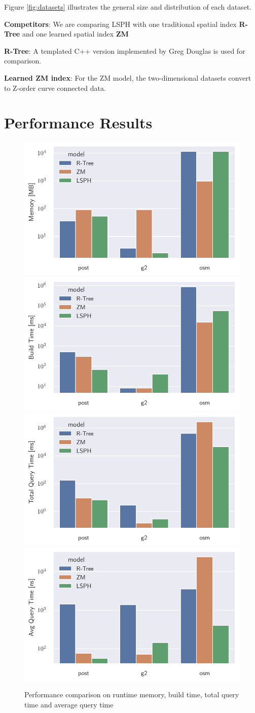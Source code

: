 Figure \ref{fig:datasets} illustrates the general size and distribution of each dataset. 

\textbf{Competitors}:
We are comparing LSPH with one traditional spatial index \textbf{R-Tree} \cite{Guttman:1984ka} and one learned spatial index \textbf{ZM} \cite{Wang:2019ks}

\textbf{R-Tree}: A templated C++ version implemented by Greg Douglas \cite{rtreecplus} is used for comparison. 

\textbf{Learned ZM index}:  For the ZM model, the two-dimensional datasets convert to Z-order curve connected data. 



\section{Performance Results}

\begin{figure}
    \includegraphics[width=.5\textwidth]{Figures/memory.pdf}\hfill
    \includegraphics[width=.5\textwidth]{Figures/build_time.pdf}
    \\[\smallskipamount]
    \includegraphics[width=.5\textwidth]{Figures/query_time.pdf}\hfill
    \includegraphics[width=.5\textwidth]{Figures/avg_query_time.pdf}
    \caption{Performance comparison on runtime memory, build time, total query time and average query time}\label{fig:performance}
\end{figure}

